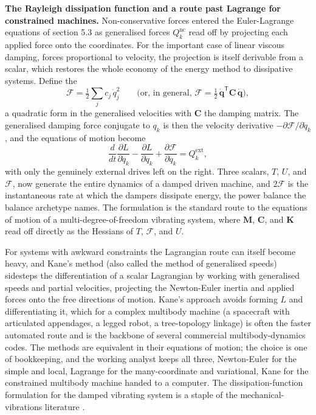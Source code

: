 \begin{mastery}
\textbf{The Rayleigh dissipation function and a route past Lagrange for
constrained machines.} Non-conservative forces entered the Euler-Lagrange
equations of section 5.3 as generalised forces $Q_k^\text{nc}$ read off by
projecting each applied force onto the coordinates. For the important case of
linear viscous damping, forces proportional to velocity, the projection is
itself derivable from a scalar, which restores the whole economy of the energy
method to dissipative systems. Define the 
\[
\mathcal{F} = \tfrac12\sum_{j} c_j\,\dot q_j^2
\qquad\text{(or, in general, }
\mathcal{F} = \tfrac12\,\dot{\mathbf q}^{\mathsf T}\mathbf{C}\,\dot{\mathbf q}
\text{)},
\]
a quadratic form in the generalised velocities with $\mathbf{C}$ the damping
matrix. The generalised damping force conjugate to $q_k$ is then the velocity
derivative $-\partial\mathcal{F}/\partial\dot q_k$, and the equations of motion
become
\[
\frac{d}{dt}\frac{\partial L}{\partial\dot q_k}
- \frac{\partial L}{\partial q_k}
+ \frac{\partial\mathcal{F}}{\partial\dot q_k}
= Q_k^\text{ext},
\]
with only the genuinely external drives left on the right. Three scalars, $T$,
$U$, and $\mathcal{F}$, now generate the entire dynamics of a damped driven
machine, and $2\mathcal{F}$ is the instantaneous rate at which the dampers
dissipate energy, the power balance the balance archetype names. The
formulation is the standard route to the equations of motion of a
multi-degree-of-freedom vibrating system, where $\mathbf{M}$, $\mathbf{C}$, and
$\mathbf{K}$ read off directly as the Hessians of $T$, $\mathcal{F}$, and $U$.

For systems with awkward constraints the Lagrangian route can itself become
heavy, and Kane's method (also called the method of generalised speeds)
sidesteps the differentiation of a scalar Lagrangian by working with
generalised speeds and partial velocities, projecting the Newton-Euler
inertia and applied forces onto the free directions of motion. Kane's approach
avoids forming $L$ and differentiating it, which for a complex multibody
machine (a spacecraft with articulated appendages, a legged robot, a
tree-topology linkage) is often the faster automated route and is the backbone
of several commercial multibody-dynamics codes. The methods are equivalent in
their equations of motion; the choice is one of bookkeeping, and the working
analyst keeps all three, Newton-Euler for the simple and local, Lagrange for
the many-coordinate and variational, Kane for the constrained multibody
machine handed to a computer. The dissipation-function formulation for the
damped vibrating system is a staple of the mechanical-vibrations literature
\cite{text:den-hartog-vibrations}.
\end{mastery}

